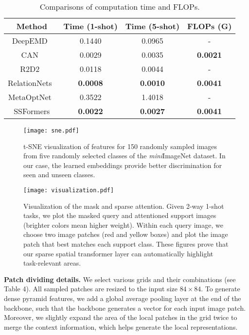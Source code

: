 \documentclass{SCIS2019}
\begin{document}
	\begin{table*}[h]
		\caption{Comparisons of computation time and FLOPs.}
		\centering
		\begin{tabular*}{\hsize}{@{}@{\extracolsep{\fill}}cccc@{}}
			\toprule
			\label{flops}
			Method  &Time (1-shot)
			&Time (5-shot)
			&FLOPs (G) \\
			\midrule
			DeepEMD~\cite{13}&0.1440&0.0965&-\\
			CAN~\cite{14}&0.0029&0.0035&\textbf{0.0021}\\
			R2D2~\cite{23}&0.0118&0.0044&-\\ 
			RelationNets~\cite{8}&\textbf{0.0008} &\textbf{0.0010}&\textbf{0.0041} \\
			MetaOptNet~\cite{29}&0.3522&1.4018& -\\
			SSFormers&\textbf{0.0022}  &\textbf{0.0027}& \textbf{0.0041} \\
			\bottomrule
			\bottomrule
		\end{tabular*}
	\end{table*}
	
	\begin{figure}[t]
		\centering
		\texttt{[image: sne.pdf]} \caption{t-SNE visualization of features for 150 randomly sampled images from five randomly selected classes of the \emph{mini}ImageNet dataset. In our case, the learned embeddings provide better discrimination for seen and unseen classes.}
	\end{figure}
	\begin{figure*}[t]
		\centering
		\texttt{[image: visualization.pdf]} \caption{Visualization of the mask and sparse attention. Given 2-way 1-shot tasks, we plot the masked query and attentioned support images (brighter colors mean higher weight). Within each query image, we choose two image patches (red and yellow boxes) and plot the image patch that best matches each support class. These figures prove that our sparse spatial transformer layer can automatically highlight task-relevant areas.}
	\end{figure*}

\textbf{Patch dividing details.} We select various grids and their combinations (see Table 4). All sampled patches are resized to the input size $84 \times 84$. To generate dense pyramid features, we add a global average pooling layer at the end of the backbone, such that the backbone generates a vector for each input image patch. Moreover, we slightly expand the area of the local patches in the grid twice to merge the context information, which helps generate the local representations. 
\end{document}
